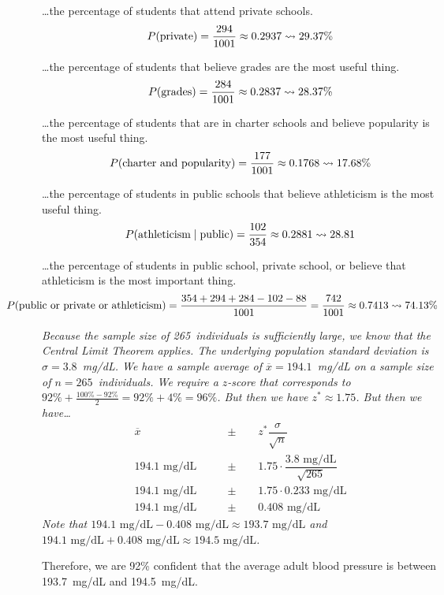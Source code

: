 \documentclass[12pt,letterpaper]{exam}
\begin{document}
\begin{questions}
\item \dots the percentage of students that attend private schools. \pvspace{0.3cm}
	\[
	P(\text{private})= \dfrac{294}{1001} \approx 0.2937 \rightsquigarrow 29.37\%
	\] \pvspace{0.3cm}

\item \dots the percentage of students that believe grades are the most useful thing. \pvspace{0.3cm}
	\[
	P(\text{grades})= \dfrac{284}{1001} \approx 0.2837 \rightsquigarrow 28.37\%
	\] \pvspace{0.3cm}

\item \dots the percentage of students that are in charter schools and believe popularity is the most useful thing. \pvspace{0.3cm}
	\[
	P(\text{charter and popularity})= \dfrac{177}{1001} \approx 0.1768 \rightsquigarrow 17.68\%
	\] \pvspace{0.3cm}

\item \dots the percentage of students in public schools that believe athleticism is the most useful thing. \pvspace{0.3cm}
	\[
	P(\text{athleticism} \;|\; \text{public})= \dfrac{102}{354} \approx 0.2881 \rightsquigarrow 28.81
	\] \pvspace{0.3cm}

\item \dots the percentage of students in public school, private school, or believe that athleticism is the most important thing. \pvspace{0.3cm}
	\[
	\hspace{-1.2cm} P(\text{public or private or athleticism})= \dfrac{354 + 294 + 284 - 102 - 88}{1001}= \dfrac{742}{1001} \approx 0.7413 \squiggle 74.13\%
	\]



{\itshape Because the sample size of 265~individuals is sufficiently large, we know that the Central Limit Theorem applies. The underlying population standard deviation is $\sigma= 3.8$~mg/dL. We have a sample average of $\overline{x}= 194.1$~mg/dL on a sample size of $n= 265$~individuals. We require a $z$-score that corresponds to $92\% + \frac{100\% - 92\%}{2}= 92\% + 4\%= 96\%$. But then we have $z^* \approx 1.75$. But then we have\dots
	\[
	\begin{aligned}
	\overline{x} \qquad&\pm\qquad z^* \dfrac{\sigma}{\sqrt{n}} \\[0.3cm]
	194.1 \text{ mg/dL} \qquad&\pm\qquad 1.75 \cdot \dfrac{3.8 \text{ mg/dL}}{\sqrt{265}} \\[0.3cm]
	194.1 \text{ mg/dL} \qquad&\pm\qquad 1.75 \cdot 0.233 \text{ mg/dL} \\[0.3cm]
	194.1 \text{ mg/dL} \qquad&\pm\qquad 0.408 \text{ mg/dL} 
	\end{aligned}
	\] \pspace
Note that $194.1 \text{ mg/dL} - 0.408 \text{ mg/dL} \approx 193.7 \text{ mg/dL}$ and $194.1 \text{ mg/dL} + 0.408 \text{ mg/dL} \approx 194.5 \text{ mg/dL}$. \pspace

Therefore, we are 92\% confident that the average adult blood pressure is between 193.7~mg/dL and 194.5~mg/dL. 
}




\end{questions}
\end{document}
